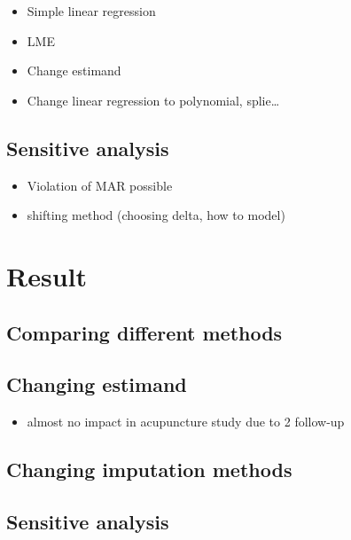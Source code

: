 \documentclass{article}
\providecommand{\tightlist}{%
  \setlength{\itemsep}{0pt}\setlength{\parskip}{0pt}}
\begin{document}
\begin{itemize}
\tightlist
\item
  Simple linear regression
\item
  LME
\item
  Change estimand
\item
  Change linear regression to polynomial, splie\ldots{}
\end{itemize}

\subsection{Sensitive analysis}\label{sensitive-analysis}

\begin{itemize}
\tightlist
\item
  Violation of MAR possible
\item
  shifting method (choosing delta, how to model)
\end{itemize}

\section{Result}\label{result}

\subsection{Comparing different
methods}\label{comparing-different-methods}

\subsection{Changing estimand}\label{changing-estimand}

\begin{itemize}
\tightlist
\item
  almost no impact in acupuncture study due to 2 follow-up
\end{itemize}

\subsection{Changing imputation
methods}\label{changing-imputation-methods-1}

\subsection{Sensitive analysis}\label{sensitive-analysis-1}
\end{document}
